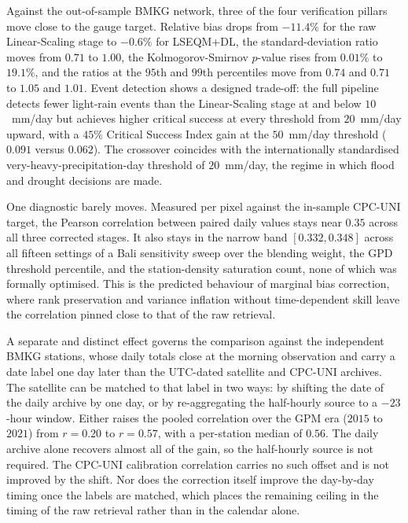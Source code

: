 Against the out-of-sample BMKG network, three of the four verification
pillars move close to the gauge target. Relative bias drops from
$-11.4\%$ for the raw Linear-Scaling stage to $-0.6\%$ for LSEQM+DL, the
standard-deviation ratio moves from $0.71$ to $1.00$, the
Kolmogorov-Smirnov $p$-value rises from $0.01\%$ to $19.1\%$, and the
ratios at the $95$th and $99$th percentiles move from $0.74$ and $0.71$
to $1.05$ and $1.01$. Event detection shows a designed trade-off: the
full pipeline detects fewer light-rain events than the Linear-Scaling
stage at and below $10$~mm/day but achieves higher critical success at
every threshold from $20$~mm/day upward, with a $45\%$ Critical Success
Index gain at the $50$~mm/day threshold ($0.091$ versus $0.062$). The
crossover coincides with the internationally standardised
very-heavy-precipitation-day threshold of $20$~mm/day, the regime in
which flood and drought decisions are made.

One diagnostic barely moves. Measured per pixel against the in-sample
CPC-UNI target, the Pearson correlation between paired daily values
stays near $0.35$ across all three corrected stages. It also stays in
the narrow band $[0.332, 0.348]$ across all fifteen settings
of a Bali sensitivity sweep over the blending weight, the GPD threshold
percentile, and the station-density saturation count, none of which was formally
optimised. This is the predicted behaviour of marginal bias correction, where rank
preservation and variance inflation without time-dependent skill leave the
correlation pinned close to that of the raw retrieval.

A separate and distinct effect governs the comparison against the
independent BMKG stations, whose daily totals close at the morning
observation and carry a date label one day later than the UTC-dated
satellite and CPC-UNI archives. The satellite can be matched to that
label in two ways: by shifting the date of the daily archive by one
day, or by re-aggregating the half-hourly source to a $-23$-hour
window. Either raises
the pooled correlation over the GPM era ($2015$ to $2021$) from
$r = 0.20$ to $r = 0.57$, with a per-station median of $0.56$. The
daily archive alone recovers almost all of the gain, so the
half-hourly source is not required. The CPC-UNI calibration
correlation carries no such offset and is not improved by the shift.
Nor does the correction itself improve the day-by-day timing once the
labels are matched, which places the remaining ceiling in the timing
of the raw retrieval rather than in the calendar alone.

